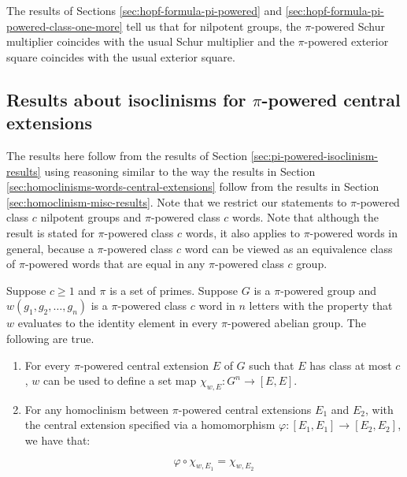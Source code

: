 The results of Sections \ref{sec:hopf-formula-pi-powered} and
\ref{sec:hopf-formula-pi-powered-class-one-more} tell us that for
nilpotent groups, the $\pi$-powered Schur multiplier coincides with
the usual Schur multiplier and the $\pi$-powered exterior square
coincides with the usual exterior square.

\subsection{Results about isoclinisms for $\pi$-powered central extensions}\label{sec:isoclinisms-pi-powered-central-extensions}

The results here follow from the results of Section
\ref{sec:pi-powered-isoclinism-results} using reasoning similar to the
way the results in Section
\ref{sec:homoclinisms-words-central-extensions} follow from the
results in Section \ref{sec:homoclinism-misc-results}. Note that we
restrict our statements to $\pi$-powered class $c$ nilpotent groups
and $\pi$-powered class $c$ words. Note that although the result is
stated for $\pi$-powered class $c$ words, it also applies to
$\pi$-powered words in general, because a $\pi$-powered class $c$ word
can be viewed as an equivalence class of $\pi$-powered words that are
equal in any $\pi$-powered class $c$ group.

\begin{lemma}\label{lemma:iterated-commutator-descends-extension-version-pi-powered}
  Suppose $c \ge 1$ and $\pi$ is a set of primes. Suppose $G$ is a
  $\pi$-powered group and $w(g_1,g_2,\dots,g_n)$ is a $\pi$-powered
  class $c$ word in $n$ letters with the property that $w$ evaluates
  to the identity element in every $\pi$-powered abelian group. The
  following are true.

  \begin{enumerate}
  \item For every $\pi$-powered central extension $E$ of $G$ such that
    $E$ has class at most $c$, $w$ can be used to define a set map
    $\chi_{w,E}: G^n \to [E,E]$.
  \item For any homoclinism between $\pi$-powered central extensions
    $E_1$ and $E_2$, with the central extension specified via a
    homomorphism $\varphi:[E_1,E_1] \to [E_2,E_2]$, we have that:

    $$\varphi \circ \chi_{w,E_1} = \chi_{w,E_2}$$
  \end{enumerate}
\end{lemma}


